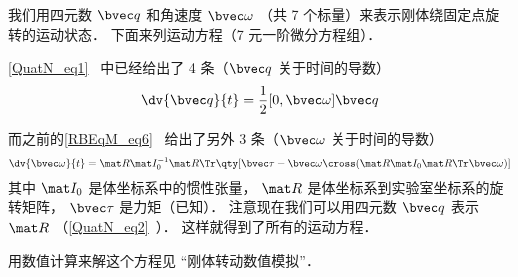 
\begin{issues}
\issueAbstract
\end{issues}


我们用四元数 $\bvec q$ 和角速度 $\bvec \omega$ （共 7 个标量）来表示刚体绕固定点旋转的运动状态． 下面来列运动方程（7 元一阶微分方程组）．

\autoref{QuatN_eq1}~ 中已经给出了 4 条（$\bvec q$ 关于时间的导数）
\begin{equation}
\dv{\bvec q}{t} = \frac12 [0, \bvec \omega] \bvec q
\end{equation}

而之前的\autoref{RBEqM_eq6}~ 给出了另外 3 条（$\bvec\omega$ 关于时间的导数）
\begin{equation}
\dv{\bvec \omega}{t} = \mat R \mat I_0^{-1} \mat R\Tr \qty[\bvec \tau  - \bvec\omega\cross(\mat R \mat I_0 \mat R\Tr \bvec\omega)]
\end{equation}
其中 $\mat I_0$ 是体坐标系中的惯性张量， $\mat R$ 是体坐标系到实验室坐标系的旋转矩阵， $\bvec\tau$ 是力矩（已知）． 注意现在我们可以用四元数 $\bvec q$ 表示 $\mat R$ （\autoref{QuatN_eq2}~）． 这样就得到了所有的运动方程．

用数值计算来解这个方程见 “刚体转动数值模拟”．
